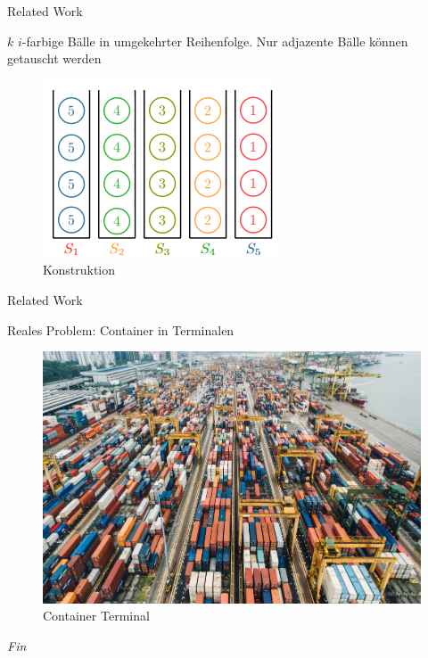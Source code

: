 \documentclass{beamer}
\begin{document}
\begin{frame}{Related Work}
	\begin{pointlist}
		\item $k$ $i$-farbige Bälle in umgekehrter Reihenfolge. Nur adjazente Bälle können getauscht werden 
	\end{pointlist}
	\begin{figure}[ht]
		\includegraphics[width=.65\textwidth]{relatedwork}
		\caption{Konstruktion}
    \end{figure}
\end{frame}

\begin{frame}{Related Work}
	\begin{pointlist}
		\item Reales Problem: Container in Terminalen
	\end{pointlist}
	\begin{figure}[ht]
		\includegraphics[width=.65\textwidth]{container}
		\caption{Container Terminal}
    \end{figure}
\end{frame}



\begin{frame}{}
  \centering \Huge
  \emph{Fin}
\end{frame}


	
    	
    	
    	
\end{document}
